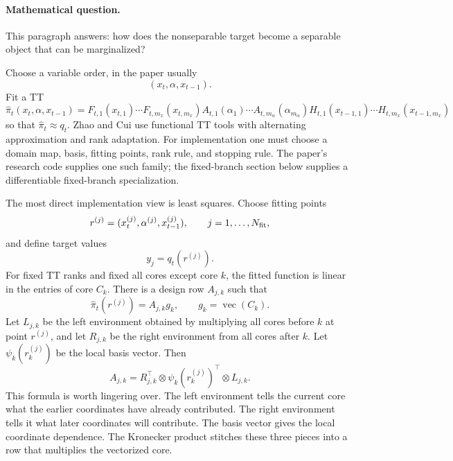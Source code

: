 \documentclass[11pt]{article}
\numberwithin{equation}{section}
\newcommand{\vecop}{\operatorname{vec}}
\begin{document}
\paragraph{Mathematical question.}
This paragraph answers: how does the nonseparable target become a separable
object that can be marginalized?

Choose a variable order, in the paper usually
\[
    (x_t,\alpha,x_{t-1}).
\]
Fit a TT
\begin{equation}
    \widehat\pi_t(x_t,\alpha,x_{t-1})
    =
    F_{t,1}(x_{t,1})\cdots F_{t,m_x}(x_{t,m_x})
    A_{t,1}(\alpha_1)\cdots A_{t,m_\alpha}(\alpha_{m_\alpha})
    H_{t,1}(x_{t-1,1})\cdots H_{t,m_x}(x_{t-1,m_x})
    \label{eq:p24-a1-2}
\end{equation}
so that \(\widehat\pi_t\approx q_t\).  Zhao and Cui \cite{zhao2024ttsequential} use functional TT tools with
alternating approximation and rank adaptation.  For implementation one must
choose a domain map, basis, fitting points, rank rule, and stopping rule.  The
paper's research code supplies one such family; the fixed-branch section below
supplies a differentiable fixed-branch specialization.

The most direct implementation view is least squares.  Choose fitting points
\[
    r^{(j)}=(x_t^{(j)},\alpha^{(j)},x_{t-1}^{(j)}),
    \qquad j=1,\ldots,N_{\rm fit},
\]
and define target values
\[
    y_j=q_t(r^{(j)}).
\]
For fixed TT ranks and fixed all cores except core \(k\), the fitted function is
linear in the entries of core \(C_k\).  There is a design row \(A_{j,k}\) such
that
\begin{equation}
    \widehat\pi_t(r^{(j)})=A_{j,k}g_k,
    \qquad g_k=\vecop(C_k).
    \label{eq:p24-a1-2a}
\end{equation}
Let \(L_{j,k}\) be the left environment obtained by multiplying all cores before
\(k\) at point \(r^{(j)}\), and let \(R_{j,k}\) be the right environment from
all cores after \(k\).  Let
\(\psi_k(r_k^{(j)})\) be the local basis vector.  Then
\begin{equation}
    A_{j,k}
    =
    R_{j,k}^{\top}\otimes \psi_k(r_k^{(j)})^\top\otimes L_{j,k}.
    \label{eq:p24-a1-2b}
\end{equation}
This formula is worth lingering over.  The left environment tells the current
core what the earlier coordinates have already contributed.  The right
environment tells it what later coordinates will contribute.  The basis vector
gives the local coordinate dependence.  The Kronecker product stitches these
three pieces into a row that multiplies the vectorized core.
\end{document}
